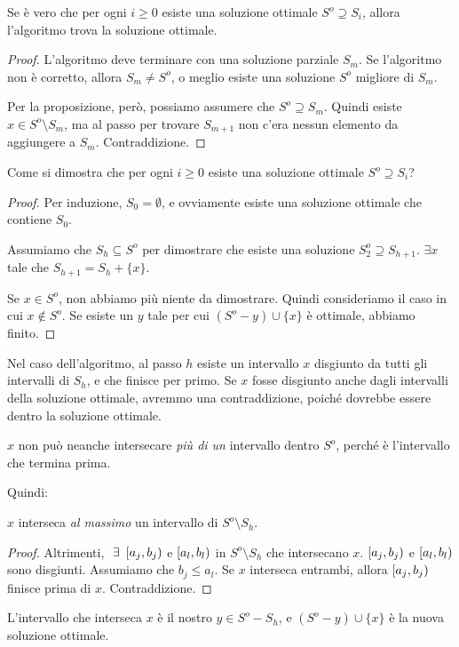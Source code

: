 \begin{exmp}
\begin{prop}
Se \`e vero che per ogni $i \ge 0$ esiste una soluzione ottimale $S^{o} \supseteq S_i$, allora l'algoritmo trova la soluzione ottimale.
\end{prop}

\begin{proof}
L'algoritmo deve terminare con una soluzione parziale $S_m$. Se l'algoritmo non \`e corretto, allora $S_m \neq S^{o}$, o meglio esiste una soluzione $S^{o}$ migliore di $S_m$.

Per la proposizione, per\`o, possiamo assumere che $S^{o} \supseteq S_m$. Quindi esiste $x \in S^{o} \setminus S_m$, ma al passo per trovare $S_{m+1}$ non c'era nessun elemento da aggiungere a $S_m$. Contraddizione. 
\end{proof}

Come si dimostra che per ogni $i \ge 0$ esiste una soluzione ottimale $S^{o} \supseteq S_i$?

\begin{proof}
Per induzione, $S_0 = \emptyset$, e ovviamente esiste una soluzione ottimale che contiene $S_0$.

Assumiamo che $S_h \subseteq S^{o}$ per dimostrare che esiste una soluzione $S^{o}_2 \supseteq S_{h+1}$. $\exists x$ tale che $S_{h+1} = S_h + \{ x \}$.

Se $x \in S^{o}$, non abbiamo pi\`u niente da dimostrare. Quindi consideriamo il caso in cui $x \notin S^{o}$. Se esiste un $y$ tale per cui $(S^{o} - y) \cup \{ x \}$ \`e ottimale, abbiamo finito. 
\end{proof}

Nel caso dell'algoritmo, al passo $h$ esiste un intervallo $x$ disgiunto da tutti gli intervalli di $S_h$, e che finisce per primo. Se $x$ fosse disgiunto anche dagli intervalli della soluzione ottimale, avremmo una contraddizione, poich\'e dovrebbe essere dentro la soluzione ottimale.

$x$ non pu\`o neanche intersecare \emph{pi\`u di un} intervallo dentro $S^{o}$, perch\'e \`e l'intervallo che termina prima.

Quindi:
\begin{prop}
$x$ interseca \emph{al massimo} un intervallo di $S^{o} \setminus S_h$.
\end{prop}

\begin{proof}
Altrimenti, $\exists \coint{a_j}{b_j}$ e $\left[ {a_l}, {b_l} \right)$ in $S^{o} \setminus S_h$ che intersecano $x$. $\left[ {a_j}, {b_j} \right)$ e $\left[ {a_l}, {b_l} \right)$ sono disgiunti. Assumiamo che $b_j \le a_l$. Se $x$ interseca entrambi, allora $\left[ {a_j}, {b_j} \right)$ finisce prima di $x$. Contraddizione.
\end{proof}

L'intervallo che interseca $x$ \`e il nostro $y \in S^{o} - S_h$, e $(S^{o} - y) \cup \{ x \}$ \`e la nuova soluzione ottimale.
\end{exmp}


